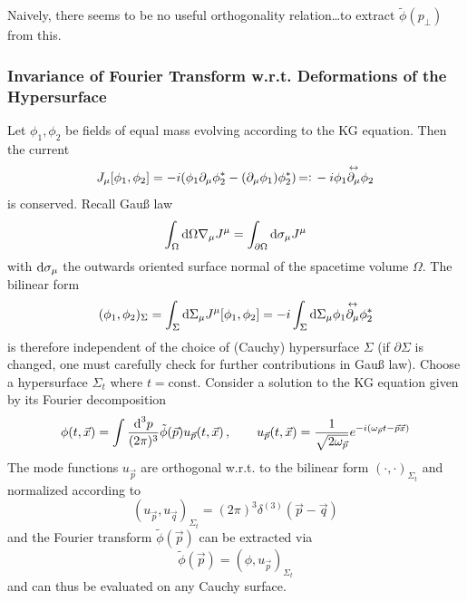 Naively, there seems to be no useful orthogonality relation\dots to extract $\tilde{\phi}(p_\perp)$ from this.

\subsubsection{Invariance of Fourier Transform w.r.t. Deformations of the Hypersurface}

Let $\phi_1,\phi_2$ be fields of equal mass evolving according to the KG equation. Then the current
\begin{equation}
    J_\mu[\phi_1,\phi_2]=-{i}(\phi_1\partial_\mu\phi_2^*-(\partial_\mu\phi_1)\phi_2^*){\,=\vcentcolon\,}-{i}\phi_1\overset{\leftrightarrow}{\partial_\mu}\phi_2
\end{equation}
is conserved. Recall Gauß law
\begin{equation}
    \int_\Omega\text{d} \Omega\nabla_\mu J^\mu=\int_{\partial\Omega}\text{d}\sigma_\mu J^\mu
\end{equation}
with $\text{d}\sigma_\mu$ the outwards oriented surface normal of the spacetime volume $\Omega$. The bilinear form
\begin{equation}
    (\phi_1,\phi_2)_\Sigma=\int_\Sigma\text{d}\Sigma_\mu J^\mu[\phi_1,\phi_2]=-{i}\int_\Sigma\text{d}\Sigma_\mu \phi_1\overset{\leftrightarrow}{\partial_\mu}\phi_2^*
\end{equation}
is therefore independent of the choice of (Cauchy) hypersurface $\Sigma$ (if $\partial\Sigma$ is changed, one must carefully check for further contributions in Gauß law). Choose a hypersurface $\Sigma_t$ where $t=\text{const}$. Consider a solution to the KG equation given by its Fourier decomposition
\begin{equation}
    \phi(t,\vec{x})=\int\frac{\text{d}^3p}{(2\pi)^3}\tilde{\phi}(\vec{p})u_{\vec{p}}(t,\vec{x})\,,\qquad u_{\vec{p}}(t,\vec{x})=\frac{1}{\sqrt{2\omega_{\vec{p}}}}e^{-{i}(\omega_{\vec{p}}t-\vec{p}\vec{x})}
\end{equation}
The mode functions $u_{\vec{p}}$ are orthogonal w.r.t. to the bilinear form $(\cdot,\cdot)_{\Sigma_t}$ and normalized according to
\begin{equation}
    (u_{\vec{p}},u_{\vec{q}})_{\Sigma_t}=(2\pi)^3\delta^{(3)}(\vec{p}-\vec{q})
\end{equation}
and the Fourier transform $\tilde{\phi}(\vec{p})$ can be extracted via $$\tilde{\phi}(\vec{p})=(\phi,u_{\vec{p}})_{\Sigma_t}$$ and can thus be evaluated on any Cauchy surface.

